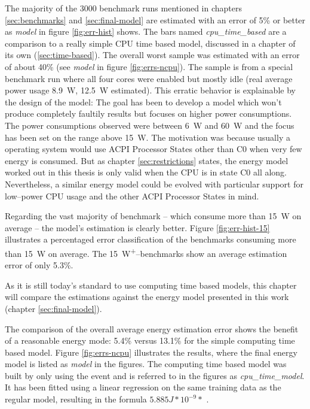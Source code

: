 The majority of the 3000 benchmark runs mentioned in chapters
\ref{sec:benchmarks} and \ref{sec:final-model} are estimated with an error of
5\% or better as \emph{model} in figure \ref{fig:err-hist} shows. The bars named
\emph{cpu\_\-time\_\-based} are a comparison to a really simple CPU time based
model, discussed in a chapter of its own (\ref{sec:time-based}). The overall
worst sample was estimated with an error of about 40\% (see \emph{model} in
figure \ref{fig:errs-ncpu}). The sample is from a special benchmark run where
all four cores were enabled but mostly idle (real average power usage
\SI{8.9}{\watt}, \SI{12.5}{\watt} estimated). This erratic behavior is
explainable by the design of the model: The goal has been to develop a model
which won't produce completely faultily results but focuses on higher power
consumptions.  The power consumptions observed were between \SI{6}{\watt} and
\SI{60}{\watt} and the focus has been set on the range above \SI{15}{\watt}. The
motivation was because usually a operating system would use ACPI Processor
States other than C0 \cite{wiki:ACPI} when very few energy is consumed. But as
chapter \ref{sec:restrictions} states, the energy model worked out in this
thesis is only valid when the CPU is in state C0 all along.  Nevertheless, a
similar energy model could be evolved with particular support for low--power CPU
usage and the other ACPI Processor States in mind.

Regarding the vast majority of benchmark -- which consume more than
\SI{15}{\watt} on average -- the model's estimation is clearly better. Figure
\ref{fig:err-hist-15} illustrates a percentaged error classification of the
benchmarks consuming more than \SI{15}{\watt} on average. The
\SI{15}{\watt}\textsuperscript{+}--benchmarks show an average estimation error
of only 5.3\%.


\label{sec:time-based}

As it is still today's standard to use computing time based models, this
chapter will compare the estimations against the energy model presented in this
work (chapter \ref{sec:final-model}).

The comparison of the overall average energy estimation error shows the benefit
of a reasonable energy mode: 5.4\% versus 13.1\% for the simple computing time
based model. Figure \ref{fig:errs-ncpu} illustrates the results, where the final
energy model is listed as \emph{model} in the figures. The computing time based
model was built by only using the event  and is
referred to in the figures as \emph{cpu\_\-time\_\-model}. It has been fitted
using a linear regression on the same training data as the regular model,
resulting in the formula $5.885J * 10^{-9} *$ .


